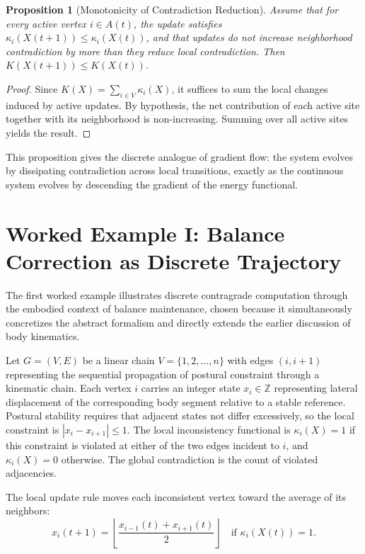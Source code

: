 \documentclass[12pt,a4paper,openany]{book}
\theoremstyle{plain}
\newtheorem{proposition}[theorem]{Proposition}
\theoremstyle{definition}
\theoremstyle{remark}
\begin{document}
\begin{proposition}[Monotonicity of Contradiction Reduction]
Assume that for every active vertex $i \in A(t)$, the update satisfies $\kappa_i(X(t+1)) \leq \kappa_i(X(t))$, and that updates do not increase neighborhood contradiction by more than they reduce local contradiction. Then $K(X(t+1)) \leq K(X(t))$.
\end{proposition}

\begin{proof}
Since $K(X) = \sum_{i \in V} \kappa_i(X)$, it suffices to sum the local changes induced by active updates. By hypothesis, the net contribution of each active site together with its neighborhood is non-increasing. Summing over all active sites yields the result.
\end{proof}

This proposition gives the discrete analogue of gradient flow: the system evolves by dissipating contradiction across local transitions, exactly as the continuous system evolves by descending the gradient of the energy functional.

\section{Worked Example I: Balance Correction as Discrete Trajectory}

The first worked example illustrates discrete contragrade computation through the embodied context of balance maintenance, chosen because it simultaneously concretizes the abstract formalism and directly extends the earlier discussion of body kinematics.

Let $G = (V, E)$ be a linear chain $V = \{1, 2, \ldots, n\}$ with edges $(i, i+1)$ representing the sequential propagation of postural constraint through a kinematic chain. Each vertex $i$ carries an integer state $x_i \in \mathbb{Z}$ representing lateral displacement of the corresponding body segment relative to a stable reference. Postural stability requires that adjacent states not differ excessively, so the local constraint is $|x_i - x_{i+1}| \leq 1$. The local inconsistency functional is $\kappa_i(X) = 1$ if this constraint is violated at either of the two edges incident to $i$, and $\kappa_i(X) = 0$ otherwise. The global contradiction is the count of violated adjacencies.

The local update rule moves each inconsistent vertex toward the average of its neighbors:
\[
x_i(t+1) = \left\lfloor \frac{x_{i-1}(t) + x_{i+1}(t)}{2} \right\rfloor \quad \text{if } \kappa_i(X(t)) = 1.
\]
\end{document}
